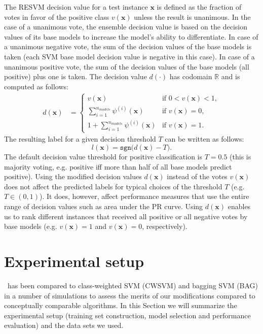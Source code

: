The RESVM decision value for a test instance $\mathbf{x}$ is defined as the fraction of votes in favor of the positive class $v(\mathbf{x})$ unless the result is unanimous. In the case of a unanimous vote, the ensemble decision value is based on the decision values of its base models to increase the model's ability to differentiate. In case of a unanimous negative vote, the sum of the decision values of the base models is taken (each SVM base model decision value is negative in this case). In case of a unanimous positive vote, the sum of the decision values of the base models (all positive) plus one is taken.
The decision value $d(\cdot)$ has codomain $\mathbb{R}$ and is computed as follows:
\begin{align}
d(\mathbf{x}) &= \left\{ \begin{array}{ll}
v(\mathbf{x}) & \text{if } 0 < v(\mathbf{x}) < 1, \\
\sum_{i=1}^{n_{models}} \psi^{(i)}(\mathbf{x}) & \text{if } v(\mathbf{x}) = 0, \\
1+\sum_{i=1}^{n_{models}} \psi^{(i)}(\mathbf{x}) & \text{if } v(\mathbf{x}) = 1.
\end{array}\right. \label{eq:resvmdecval}
\end{align}
The resulting label for a given decision threshold $T$ can be written as follows:
\begin{equation}
l(\mathbf{x}) = \mathtt{sgn}\big(d(\mathbf{x})-T\big). \label{eq:resvmlabel}
\end{equation}
The default decision value threshold for positive classification is $T=0.5$ (this is majority voting, e.g. positive iff more than half of all base models predict positive). Using the modified decision values $d(\mathbf{x})$ instead of the votes $v(\mathbf{x})$ does not affect the predicted labels for typical choices of the threshold $T$ (e.g. $T \in (0, 1)$). It does, however, affect performance measures that use the entire range of decision values such as area under the PR curve. Using $d(\mathbf{x})$ enables us to rank different instances that received all positive or all negative votes by base models (e.g. $v(\mathbf{x})=1$ and $v(\mathbf{x})=0$, respectively).


\section{Experimental setup}
\resvm\ has been compared to class-weighted SVM (CWSVM) and bagging SVM (BAG) in a number of simulations to assess the merits of our modifications compared to conceptually comparable algorithms. In this Section we will summarize the experimental setup (training set construction, model selection and performance evaluation) and the data sets we used. 

